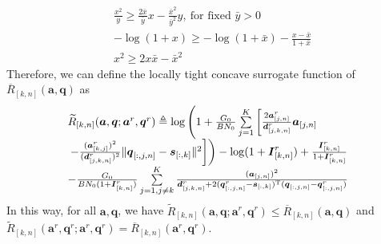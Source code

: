 \documentclass[10pt,final,conference]{IEEEtran}
\begin{document}
\begin{subequations}
	\begin{flalign}
		&\frac{x^2}{y} \geq \frac{2\bar{x}}{\bar{y}}x-\frac{\bar{x}^2}{\bar{y}^2}y,\ \text{for fixed }\bar{y}>0\label{15a} \\
		&-\log(1+x) \geq -\log(1+\bar{x}) - \frac{x-\bar{x}}{1+\bar{x}}\label{15b} \\
		&x^2 \geq 2x\bar{x}-\bar{x}^2\label{15c}
	\end{flalign}
\end{subequations}
Therefore, we can define the locally tight concave surrogate function of $\overline{R}_{[k,n]}(\boldsymbol{a},\boldsymbol{q})$ as 
\begin{equation}\label{Eq16}
	\begin{array}{ll}
		\widetilde{R}_{[k,n]}(\boldsymbol{a},\boldsymbol{q};\boldsymbol{a}^r,\boldsymbol{q}^r) \triangleq\log\left(1+\frac{G_0}{BN_0}\sum\limits_{j=1}^K\left[\frac{2\boldsymbol{a}^r_{[j,n]}}{\boldsymbol{d}^r_{[j,k,n]}}\boldsymbol{a}_{[j,n]}\right.\right. \\
		\left.\left.-\frac{(\boldsymbol{a}^r_{[k,j]})^2}{(\boldsymbol{d}^r_{[j,k,n]})^2}\lVert\boldsymbol{q}_{[:,j,n]}-\boldsymbol{s}_{[:,k]}\rVert^2\right]\right)-\log(1+\boldsymbol{I}^r_{[k,n]})+\frac{\boldsymbol{I}^r_{[k,n]}}{1+\boldsymbol{I}^r_{[k,n]}} \\
		-\frac{G_0}{BN_0(1+\boldsymbol{I}^r_{[k,n]})}\sum\limits_{j=1,j\ne k}^{K}\frac{(\boldsymbol{a}_{[j,n]})^2}{\boldsymbol{d}^r_{[j,k,n]}+2(\boldsymbol{q}^r_{[:,j,n]}-\boldsymbol{s}_{[:,k]})^{\rm T}(\boldsymbol{q}_{[:,j,n]}-\boldsymbol{q}^r_{[:,j,n]})}
	\end{array}
\end{equation}
In this way, for all $\boldsymbol{a},\boldsymbol{q}$, we have $\widetilde{R}_{[k,n]}(\boldsymbol{a},\boldsymbol{q};\boldsymbol{a}^r,\boldsymbol{q}^r)\leq\overline{R}_{[k,n]}(\boldsymbol{a},\boldsymbol{q})$ and $\widetilde{R}_{[k,n]}(\boldsymbol{a}^r,\boldsymbol{q}^r;\boldsymbol{a}^r,\boldsymbol{q}^r)=\overline{R}_{[k,n]}(\boldsymbol{a}^r,\boldsymbol{q}^r)$. 
\end{document}
